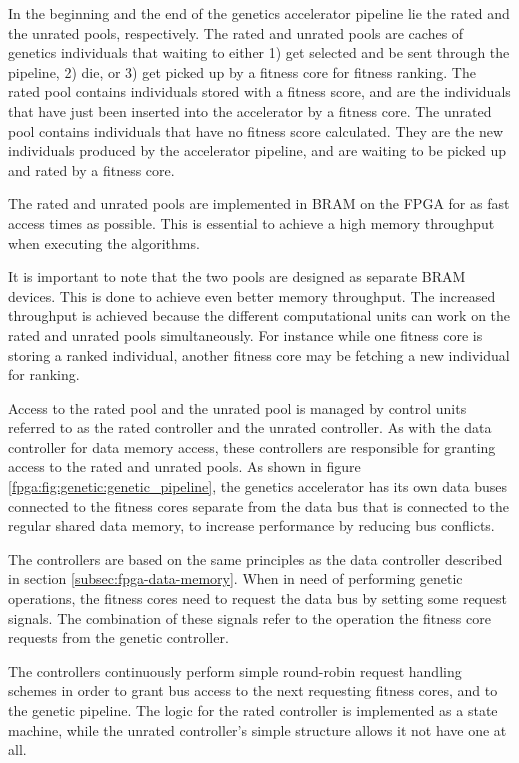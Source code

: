 In the beginning and the end of the genetics accelerator pipeline lie the rated and the unrated pools, respectively.
The rated and unrated pools are caches of genetics individuals that waiting to either 1) get selected and be sent through the pipeline, 2) die, or 3) get picked up by a fitness core for fitness ranking.
The rated pool contains individuals stored with a fitness score, and are the individuals that have just been inserted into the accelerator by a fitness core.
The unrated pool contains individuals that have no fitness score calculated.
They are the new individuals produced by the accelerator pipeline, and are waiting to be picked up and rated by a fitness core.

The rated and unrated pools are implemented in \gls{BRAM} on the FPGA for as fast access times as possible.
This is essential to achieve a high memory throughput when executing the algorithms.

It is important to note that the two pools are designed as separate \gls{BRAM} devices.
This is done to achieve even better memory throughput.
The increased throughput is achieved because the different computational units can work on the rated and unrated pools simultaneously.
For instance while one fitness core is storing a ranked individual, another fitness core may be fetching a new individual for ranking. 

Access to the \gls{rated pool} and the \gls{unrated pool} is managed by control units referred to as the \gls{rated controller} and the \gls{unrated controller}.
As with the \gls{data controller} for data memory access, these controllers are responsible for granting access to the rated and unrated pools.
As shown in figure \vref{fpga:fig:genetic:genetic_pipeline}, the genetics accelerator has its own data buses connected to the fitness cores separate from the data bus that is connected to the regular shared data memory, to increase performance by reducing bus conflicts.

The controllers are based on the same principles as the \gls{data controller} described in section \vref{subsec:fpga-data-memory}.
When in need of performing genetic operations, the fitness cores need to request the data bus by setting some request signals.
The combination of these signals refer to the operation the fitness core requests from the genetic controller. 

The controllers continuously perform simple round-robin request handling schemes in order to grant bus access to the next requesting fitness cores, and to the genetic pipeline.
The logic for the \gls{rated controller} is implemented as a state machine, while the \gls{unrated controller}'s simple structure allows it not have one at all.

